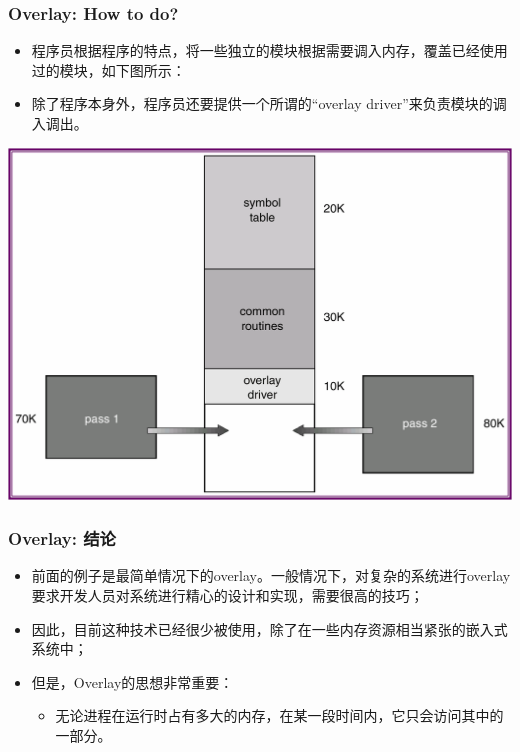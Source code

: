 \documentclass[CJKutf8,xcolor=pdftex,dvipsnames,table]{beamer}
\begin{document}
\begin{CJK*}{UTF8}{song}
  \begin{frame}
  \frametitle{Overlay: How to do?} \pause
  \begin{itemize}
  \item{程序员根据程序的特点，将一些独立的模块根据需要调入内存，覆盖已经使用过的模块，如下图所示：} \pause
  \item{除了程序本身外，程序员还要提供一个所谓的“overlay driver”来负责模块的调入调出。} \pause
  \end{itemize}
  \begin{center}
    \includegraphics[scale=0.4]{v6f9-3}
  \end{center}
  \end{frame}
  
  \begin{frame}
  \frametitle{Overlay: 结论} \pause
  \begin{itemize}
  \item{前面的例子是最简单情况下的overlay。一般情况下，对复杂的系统进行overlay要求开发人员对系统进行精心的设计和实现，需要很高的技巧；} \pause
  \item{因此，目前这种技术已经很少被使用，除了在一些内存资源相当紧张的嵌入式系统中；} \pause
  \item{但是，Overlay的思想非常重要：} \pause
    \begin{itemize}
    \item{无论进程在运行时占有多大的内存，在某一段时间内，它只会访问其中的一部分。}
    \end{itemize}
  \end{itemize}
  \end{frame}
  

\end{CJK*}
\end{document}
